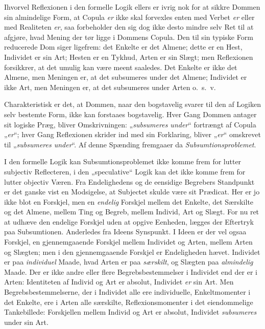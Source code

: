 \documentclass[12pt]{book}
\newcommand{\opage}[1]{\marginnote{\footnotesize\textit{[#1]}}}
\begin{document}
Ihvorvel Reflexionen i den formelle Logik ellers er ivrig nok for at sikkre Dommen sin almindelige Form, at Copula \emph{er} ikke skal forvexles enten med Verbet \emph{er} eller med Realiteten \emph{er}, saa forbeholder den sig dog ikke desto mindre selv Ret til at afgjøre, hvad Mening der tør ligge i Dommens Copula. Den til sin typiske Form reducerede Dom siger ligefrem: det Enkelte er det Almene; dette er en Hest, Individet er sin Art; Hesten er en Tykhud, Arten er sin Slægt; men Reflexionen forsikkrer, at det umulig kan være meent saaledes. Det Enkelte er ikke det Almene, men Meningen er, at det subsumeres under det Almene; Individet er ikke Art, men Meningen er, at det subsumeres under Arten o.\ s.\ v.

Charakteristisk er det, at Dommen, naar den bogstavelig svarer til den af Logiken selv bestemte Form, ikke kan forstaaes bogstavelig. Hver Gang Dommen antager sit logiske Præg,
\opage{348}bliver Omskrivningen: „\emph{subsumeres under}“ fortrængt af Copula „\emph{er}“; hver Gang Reflexionen skrider ind med sin Forklaring, bliver „\emph{er}“ omskrevet til „\emph{subsumeres under}“. Af denne Spænding fremgaaer da \emph{Subsumtionsproblemet}.

I den formelle Logik kan Subsumtionsproblemet ikke komme frem for lutter subjectiv Reflecteren, i den „speculative“ Logik kan det ikke komme frem for lutter objectiv Væren. Fra Endelighedens og de eensidige Begrebers Standpunkt er det ganske vist en Modsigelse, at Subjectet skulde være sit Prædicat. Her er jo ikke blot en Forskjel, men en \emph{endelig} Forskjel mellem det Enkelte, det Særskilte og det Almene, mellem Ting og Begreb, mellem Individ, Art og Slægt. For nu ret at udhæve den endelige Forskjel uden at opgive Eenheden, lægges der Eftertryk paa Subsumtionen. Anderledes fra Ideens Synspunkt. I Ideen er der vel ogsaa Forskjel, en gjennemgaaende Forskjel mellem Individet og Arten, mellem Arten og Slægten; men i den gjennemgaaende Forskjel er Endeligheden hævet. Individet er paa \emph{individuel} Maade, hvad Arten er paa \emph{særskilt}, og Slægten paa \emph{almindelig} Maade. Der er ikke andre eller flere Begrebsbestemmelser i Individet end der er i Arten: Identiteten af Individ og Art er absolut, Individet \emph{er} sin Art. Men Begrebsbestemmelserne, der i Individet alle ere individuelle, Enkeltmomenter i det Enkelte, ere i Arten alle særskilte, Reflexionsmomenter i det eiendommelige Tankebillede: Forskjellen mellem Individ og Art er absolut, Individet \emph{subsumeres} under sin Art.
\end{document}
